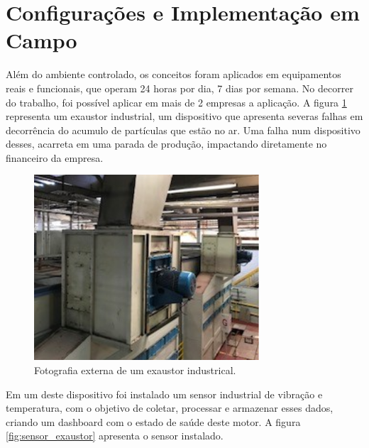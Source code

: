 % 

\section{Configurações e Implementação em Campo}

Além do ambiente controlado, os conceitos foram aplicados em equipamentos reais e funcionais, que operam 24 horas por dia, 7 dias por semana. 
No decorrer do trabalho, foi possível aplicar em mais de 2 empresas a aplicação. A figura \ref{fig:exautor} representa um exaustor industrial,
um dispositivo que apresenta severas falhas em decorrência do acumulo de partículas que estão no ar. Uma falha num dispositivo desses, acarreta
em uma parada de produção, impactando diretamente no financeiro da empresa.

\begin{figure}[H]
    \caption{Fotografia externa de um exaustor industrical.}
    \begin{center}
        \includegraphics[scale=1.25]{metodologia/img/exaustor.png}
    \end{center}
    \label{fig:exautor}
\end{figure}

Em um deste dispositivo foi instalado um sensor industrial de vibração e temperatura, com o objetivo de coletar, processar e armazenar esses
dados, criando um dashboard com o estado de saúde deste motor. A figura \ref{fig:sensor_exaustor} apresenta o sensor instalado.

